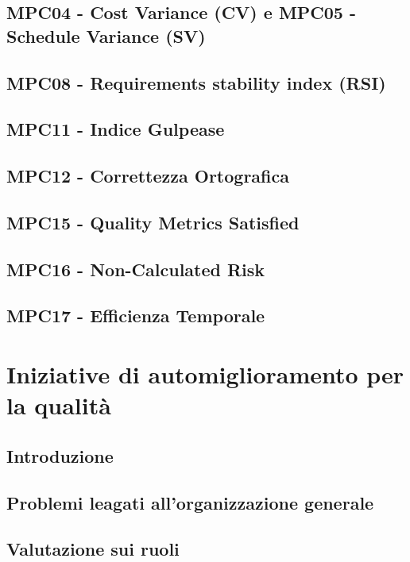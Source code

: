 \documentclass[italian,12pt]{article} %
\begin{document}
\subsection{MPC04 - Cost Variance (CV) e MPC05 - Schedule Variance (SV)}

\subsection{MPC08 - Requirements stability index (RSI)}

\subsection{MPC11 - Indice Gulpease}

\subsection{MPC12 - Correttezza Ortografica}

\subsection{MPC15 - Quality Metrics Satisfied}

\subsection{MPC16 - Non-Calculated Risk}

\subsection{MPC17 - Efficienza Temporale}

\section{Iniziative di automiglioramento per la qualità}

\subsection{Introduzione}

\subsection{Problemi leagati all’organizzazione generale}

\subsection{Valutazione sui ruoli}
\end{document}
